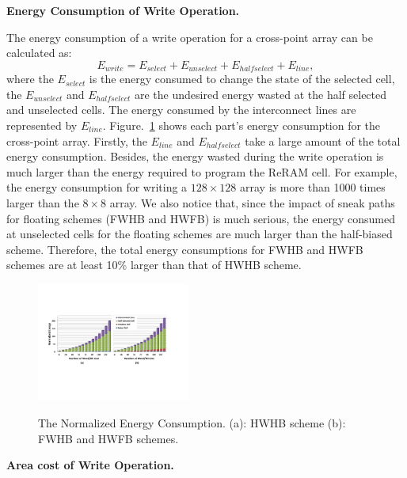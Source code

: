 \vspace{10pt} \textbf{Energy Consumption of Write Operation.} \vspace{8pt}

The energy consumption of a write operation for a cross-point array can be calculated as:
\begin{equation}
E_{write} = E_{select} + E_{unselect} + E_{halfselect} + E_{line},
\end{equation}
where the $E_{select}$ is the energy consumed to change the state of the
selected cell, the $E_{unselect}$ and $E_{halfselect}$ are the undesired energy wasted at the half selected and unselected cells. The energy consumed by the interconnect lines are represented by $E_{line}$. Figure.~\ref{fig:energy} shows each part's energy consumption for the cross-point array. Firstly, the $E_{line}$ and $E_{halfselect}$ take a large amount of the total energy consumption. Besides, the energy wasted during the write operation is much larger than the energy required to program the ReRAM cell. For example, the energy consumption for writing a $128{\times}128$ array is more than 1000 times larger than the $8{\times}8$ array. We also notice that, since the impact of sneak paths for floating schemes (FWHB and HWFB) is much serious, the energy consumed at unselected cells for the floating schemes are much larger than the half-biased scheme. Therefore, the total energy consumptions for FWHB and HWFB schemes are at least 10\% larger than that of HWHB scheme.


\begin{figure}%
\centering
  \includegraphics[width=0.45\textwidth]{./figures/energy4.pdf}\\
  \caption{The Normalized Energy Consumption. (a): HWHB scheme (b): FWHB and HWFB schemes.}\label{fig:energy}
\end{figure}

\vspace{10pt} \textbf{Area cost of Write Operation.} \vspace{8pt}


